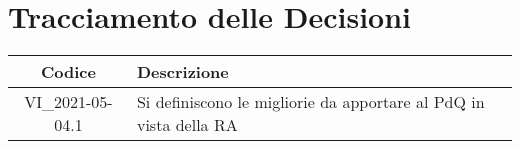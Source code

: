 \section*{Tracciamento delle Decisioni}

\begin{center}
	\begin{longtable}{|c|p{13cm}|}
	\hline
	\rowcolor{lighter-grayer}
	\textbf{Codice} & \textbf{Descrizione} \\
	\hline
	\endfirsthead
	
	\hline
	VI\_2021-05-04.1 & Si definiscono le migliorie da apportare al PdQ in vista della RA\\
	\hline

	\end{longtable}
\end{center}
